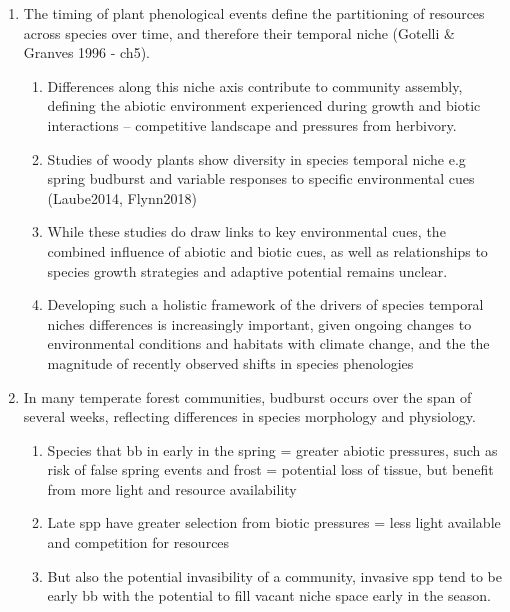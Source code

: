 \documentclass{article}
\begin{document}
\begin{enumerate}
\item The timing of plant phenological events define the partitioning of resources across species over time, and therefore their temporal niche (Gotelli \& Granves 1996 - ch5).
\begin{enumerate}
\item Differences along this niche axis contribute to community assembly, defining the abiotic environment experienced during growth and biotic interactions -- competitive landscape and pressures from herbivory.
\item Studies of woody plants show diversity in species temporal niche e.g spring budburst and variable responses to specific environmental cues (Laube2014, Flynn2018)
\item While these studies do draw links to key environmental cues, the combined influence of abiotic and biotic cues, as well as relationships to species growth strategies and adaptive potential remains unclear.
\item Developing such a holistic framework of the drivers of species temporal niches differences is increasingly important, given ongoing changes to environmental conditions and habitats with climate change, and the the magnitude of recently observed shifts in species phenologies
\end{enumerate}


\item In many temperate forest communities, budburst occurs over the span of several weeks, reflecting differences in species morphology and physiology.
\begin{enumerate}
\item Species that bb in early in the spring = greater abiotic pressures, such as risk of false spring events and frost = potential loss of tissue, but benefit from more light and resource availability
\item Late spp have greater selection from biotic pressures = less light available and competition for resources 
\item But also the potential invasibility of a community, invasive spp tend to be early bb with the potential to fill vacant niche space early in the season. 
\end{enumerate}


\end{enumerate}
\end{document}
